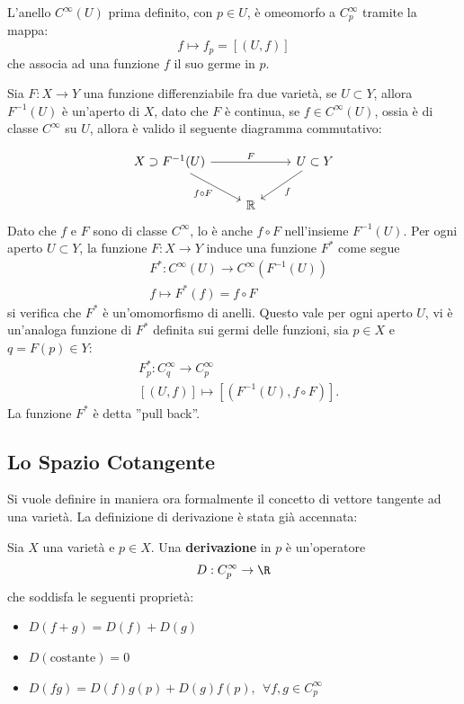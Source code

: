 \documentclass[10pt, letterpaper]{report}
\begin{document}
\noindent
L'anello $C^\infty(U)$ prima definito, con $p\in U$, è omeomorfo a $C_p^\infty$ tramite la mappa:\begin{equation}
    f\longmapsto  f_p=[(U,f)]
\end{equation}
che associa ad una funzione $f$ il suo germe in $p$.
\begin{osservazione}
    Sia $F:X\rightarrow Y$ una funzione differenziabile fra due varietà, se $U\subset Y$, allora $F^{-1}(U)$ è un'aperto di $X$, dato che $F$ è continua, se $f\in C^{\infty}(U)$, ossia è di classe $C^\infty$ su $U$, allora è valido il seguente diagramma commutativo:
\end{osservazione}
\[
\begin{tikzcd}
X \supset F^{-1}(U) \arrow[rr, "F"] \arrow[dr, "f \circ F"'] & & U \subset Y \arrow[dl, "f"] \\
& \mathbb{R} &
\end{tikzcd}
\]
Dato che $f$ e $F$ sono di classe $C^\infty$, lo è anche $f\circ F$ nell'insieme $F^{-1}(U)$. Per ogni aperto $U\subset Y$, la funzione $F:X\rightarrow Y$ induce una funzione $F^*$ come segue
\begin{align}
    &F^*:C^\infty(U)\rightarrow C^\infty(F^{-1}(U))\\
    &f\longmapsto F^*(f)=f\circ F
\end{align}
si verifica che $F^*$ è un'omomorfismo di anelli. Questo vale per ogni aperto $U$, vi è un'analoga funzione di $F^*$ definita sui germi delle funzioni, sia $p\in X$ e $q=F(p)\in Y$:\begin{align}
    &F_p^*:C^\infty_q\rightarrow C^\infty_p\\
    &[(U,f)]\longmapsto [(F^{-1}(U),f\circ F)].
\end{align}
La funzione $F^*$ è detta ''pull back''.\subsection{Lo Spazio Cotangente}
Si vuole definire in maniera ora formalmente il concetto di vettore tangente ad una varietà. La definizione di derivazione è stata già accennata:\begin{definizione}\label{def:derivazioni}
    Sia $X$ una varietà e $p\in X$. Una \textbf{derivazione} in $p$ è un'operatore \begin{equation}
        D:C^\infty_p\rightarrow \R  
    \end{equation}
    che soddisfa le seguenti proprietà:\begin{itemize}
        \item $D(f+g)=D(f)+D(g)$
        \item $D(\text{costante})=0$
        \item $D(fg)=D(f)g(p)+D(g)f(p), \ \ \forall f,g\in C_p^\infty$
    \end{itemize}
\end{definizione}
\end{document}
